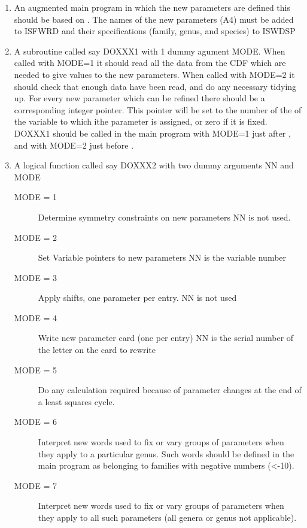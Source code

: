 \begin{enumerate}   
\item   		 An augmented main program in which the new parameters are defined
             this should be based on .
             The names of the new parameters (A4) must be added to ISFWRD
             and their specifications (family, genus, and species) to ISWDSP
\item       A subroutine called say DOXXX1 with 1 dummy agument MODE.
             When called with MODE=1 it should read all the data from the
             CDF which are needed to give values to the new parameters.
             When called with MODE=2 it should check that enough data have
             been read, and do any necessary tidying up.
             For every new parameter which can be refined there should be a
             corresponding integer pointer. This pointer will be set to the
             number  of the of the variable to which ithe parameter is
             assigned, or zero if it is fixed.
             DOXXX1 should be called in the main program with MODE=1 just after
             , and with MODE=2 just before .
\item       A logical function called say DOXXX2 with two dummy arguments
             NN and MODE
\begin{description}             
\item[MODE = 1] Determine symmetry constraints on new parameters
                      NN is not used.
\item[MODE = 2] Set Variable pointers to new parameters
                 NN is the variable number
\item[MODE = 3] Apply shifts, one parameter per entry.
                      NN is not used
\item[MODE = 4] Write new parameter card (one per entry)
                      NN is the serial number of the letter on the card to
                      rewrite
\item [MODE = 5] Do any calculation required because of parameter changes 
                      at the end of a least squares cycle.
\item [MODE = 6] Interpret new words used to fix or vary groups of parameters
 when they apply to a particular genus.
 Such words should be defined in the main program as belonging to families
 with  negative numbers (<-10).
\item [MODE = 7] Interpret new words used to fix or vary groups of parameters
 when they apply to all such parameters (all genera or genus not applicable).

\end{description}
\end{enumerate}
